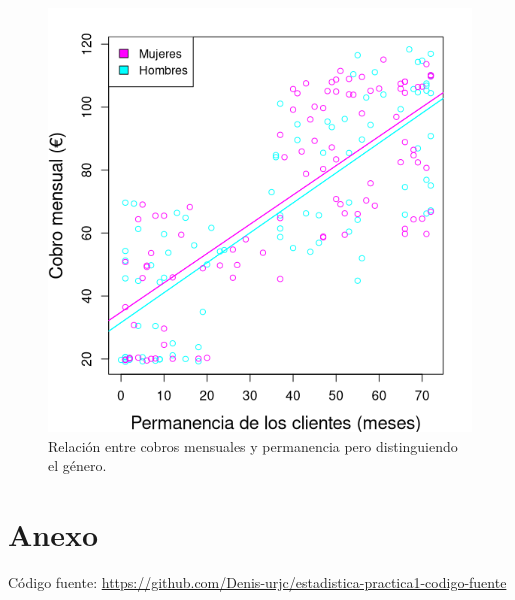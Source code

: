 \documentclass[10pt,a4paper, titlepage]{article}
\begin{document}
\begin{figure}[!htb]
\begin{minipage}{0.48\textwidth}
     \includegraphics[width=\linewidth]{month-churn-gen}
     \caption{Relación entre cobros mensuales y permanencia pero distinguiendo el género.}\label{fig: month-churn-gen}
   \end{minipage}
\end{figure}
\section{Anexo}
Código fuente: \url{https://github.com/Denis-urjc/estadistica-practica1-codigo-fuente}
\end{document}
